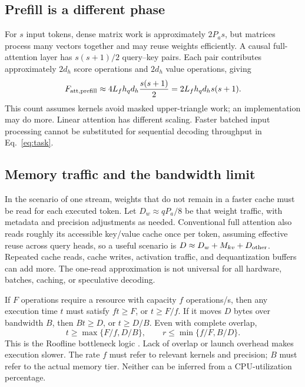 \documentclass[11pt]{article}
\begin{document}
\subsection{Prefill is a different phase}
For $s$ input tokens, dense matrix work is approximately $2P_a s$, but matrices process many vectors together and may reuse weights efficiently. A causal full-attention layer has $s(s+1)/2$ query--key pairs. Each pair contributes approximately $2d_h$ score operations and $2d_h$ value operations, giving
\begin{equation}
F_{\rm att,prefill}\approx4L_fh_qd_h\frac{s(s+1)}2
=2L_fh_qd_hs(s+1).
\end{equation}
This count assumes kernels avoid masked upper-triangle work; an implementation may do more. Linear attention has different scaling. Faster batched input processing cannot be substituted for sequential decoding throughput in Eq.~\eqref{eq:task}.

\subsection{Memory traffic and the bandwidth limit}
In the scenario of one stream, weights that do not remain in a faster cache must be read for each executed token. Let $D_w\approx qP_a/8$ be that weight traffic, with metadata and precision adjustments as needed. Conventional full attention also reads roughly its accessible key/value cache once per token, assuming effective reuse across query heads, so a useful scenario is $D\approx D_w+M_{kv}+D_{\rm other}$. Repeated cache reads, cache writes, activation traffic, and dequantization buffers can add more. The one-read approximation is not universal for all hardware, batches, caching, or speculative decoding.

If $F$ operations require a resource with capacity $f$ operations/s, then any execution time $t$ must satisfy $ft\ge F$, or $t\ge F/f$. If it moves $D$ bytes over bandwidth $B$, then $Bt\ge D$, or $t\ge D/B$. Even with complete overlap,
\begin{equation}\label{eq:roof}
t\ge\max\{F/f,D/B\},\qquad r\le\min\{f/F,B/D\}.
\end{equation}
This is the Roofline bottleneck logic \citep{roofline}. Lack of overlap or launch overhead makes execution slower. The rate $f$ must refer to relevant kernels and precision; $B$ must refer to the actual memory tier. Neither can be inferred from a CPU-utilization percentage.
\end{document}
